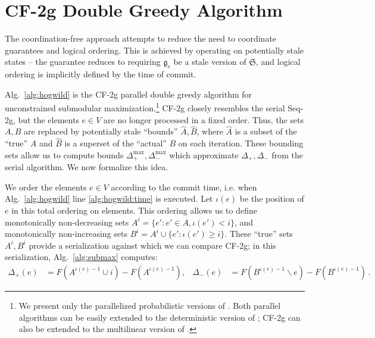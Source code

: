 \documentclass{article} %
\newcommand{\hogwild}{CF-2g}
\newcommand{\seqalg}{Seq-2g}
\newcommand{\Comments}{1}
\newcommand{\note}[2]{\ifnum\Comments=1\textcolor{#1}{#2}\fi}
\newcommand{\xinghao}[1]{\note{red}{[XP: #1]}}
\newcommand{\algref}[1]{Alg.~\ref{#1}}
\begin{document}
\begin{figure}[h]
\begin{multicols}{2}
\begin{minipage}{0.49\textwidth}
    \end{minipage}



  \end{multicols}
  \label{fig:submax}
\end{figure}








\section{\hogwild{} Double Greedy Algorithm \label{sec:alghogwild}}
The coordination-free approach attempts to reduce the need to coordinate guarantees and logical ordering.
This is achieved by operating on potentially stale states -- the guarantee reduces to requiring $\mathfrak{g}_e$ be a stale version of $\mathfrak{S}$, and logical ordering is implicitly defined by the time of commit.

\algref{alg:hogwild} is the \hogwild{} parallel double greedy algorithm for unconstrained submodular maximization.\footnote{We present only the parallelized probabilistic versions of \cite{buchbinder2012}. Both parallel algorithms can be easily extended to the deterministic version of \cite{buchbinder2012}; \hogwild{} can also be extended to the multilinear version of \cite{buchbinder2012}.}
\hogwild{} closely resembles the serial \seqalg{}, but the elements $e \in V$ are no longer processed in a fixed order.  Thus, the sets $A, B$ are replaced by potentially stale ``bounds'' $\hat{A}, \hat{B}$, where $\hat{A}$ is a subset of the ``true'' $A$ and $\hat{B}$ is a superset of the ``actual'' $B$ on each iteration.
These bounding sets allow us to compute bounds $\Delta_{+}^{\max}, \Delta_{-}^{\max}$ which approximate $\Delta_{+}, \Delta_{-}$ from the serial algorithm.
We now formalize this idea.

We order the elements $e \in V$ according to the commit time, i.e. when \algref{alg:hogwild} line \ref{alg:hogwild:time} is executed.
Let $\iota(e)$ be the position of $e$ in this total ordering on elements.
This ordering allows us to define monotonically non-decreasing sets $A^i = \{e' : e' \in A, \iota(e') < i\}$, and monotonically non-increasing sets $B^i = A^i \cup \{e': \iota(e') \geq i\}$.
These ``true'' sets $A^i, B^i$ provide a serialization against which we can compare \hogwild{}; in this serialization, \algref{alg:submax} computes:
\begin{align*}
  \Delta_{+}       (e) &= F(A^{\iota(e)-1}\cup i) - F(A^{\iota(e)-1}),
& \Delta_{-}       (e) &= F(B^{\iota(e)-1}\backslash e) - F(B^{\iota(e)-1}) \, .
\end{align*}
\end{document}
